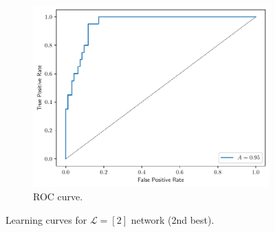 \documentclass[conference]{IEEEtran}
\theoremstyle{definition}
\theoremstyle{remark}
\theoremstyle{remark}
\begin{document}
\begin{figure}
\begin{subfigure}[b]{0.32\textwidth}
        \includegraphics[width=\textwidth]{figs/2-0.9-roc.pdf}
        \caption{ROC curve.}
    \end{subfigure}
    \caption{Learning curves for $\mathcal{L}=[2]$ network (2nd best).}
    \label{fig:NN-2best}
\end{figure}
\end{document}
